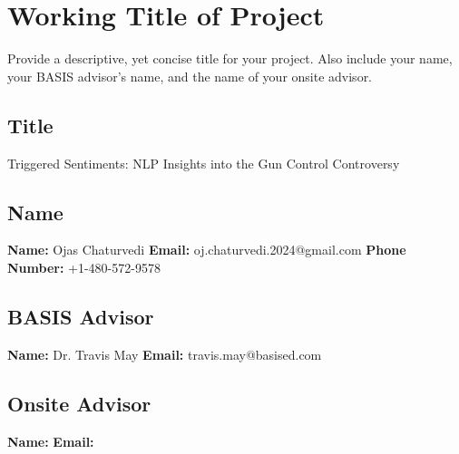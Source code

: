 
\section[Working Title of Project]{Working Title of Project}

Provide a descriptive, yet concise title for your project. Also include your name, your BASIS advisor's name, and the name of your onsite advisor.

\subsection{Title}
Triggered Sentiments: NLP Insights into the Gun Control Controversy

\subsection{Name}
\textbf{Name:} Ojas Chaturvedi
\newline
\textbf{Email: } oj.chaturvedi.2024@gmail.com
\newline
\textbf{Phone Number:} +1-480-572-9578

\subsection{BASIS Advisor}
\textbf{Name:} Dr. Travis May
\newline
\textbf{Email: } travis.may@basised.com

\subsection{Onsite Advisor}
\textbf{Name:}
\newline
\textbf{Email: }